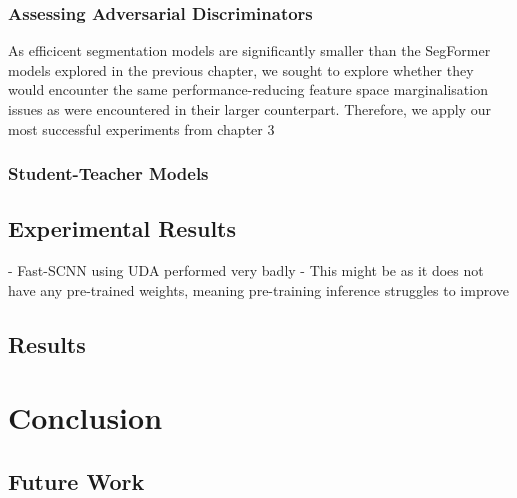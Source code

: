 \documentclass[a4paper,12pt]{report}
\begin{document}
\subsection{Assessing Adversarial Discriminators}
As efficicent segmentation models are significantly smaller than the SegFormer models explored in the previous chapter, we sought to explore whether they would encounter the same performance-reducing feature space marginalisation issues as were encountered in their larger counterpart. Therefore, we apply our most successful experiments from chapter 3

\subsection{Student-Teacher Models}

\section{Experimental Results}



- Fast-SCNN using UDA performed very badly
- This might be as it does not have any pre-trained weights, meaning pre-training inference struggles to improve

\section{Results}

\FloatBarrier


\chapter{Conclusion}
\section{Future Work}


{}

\end{document}
